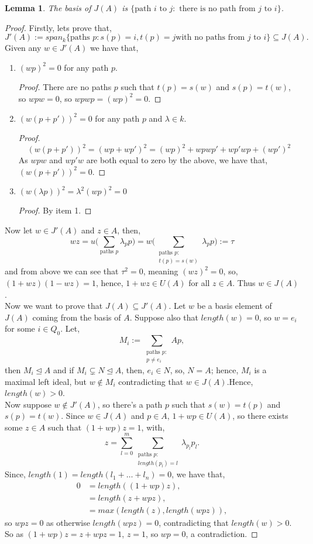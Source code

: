 \documentclass[11.5pt, twoside, a4paper, titlepage]{report}
\providecommand{\equ}[0]{\begin{equation*}}
\providecommand{\eequ}[0] {\end{equation*}}
\theoremstyle{definition}
\theoremstyle{plain}
\newtheorem{lem}[mydef]{Lemma}
\begin{document}
\begin{lem}
The basis of $J(A)$ is $\{\text{path } i \text{ to }j: \text{ there is no path from } j \text{ to }i\}$.
\end{lem}
\begin{proof}
Firstly, lets prove that, 
\equ
J'(A):= span_k\{\text{paths }p:s(p)=i, t(p)=j\text{with no paths from $j$ to $i$}\}\subseteq J(A).
\eequ
Given any $w\in J'(A)$ we have that, 
\begin{enumerate}
\item $(wp)^2=0$ for any path $p$.
\begin{proof}
There are no paths $p$ such that $t(p)=s(w)$ and $s(p)=t(w)$, so $wpw=0$, so $wpwp=(wp)^2=0$.
\end{proof}
\item $(w(p+p'))^2=0$ for any path $p$ and $\lambda\in k$.
\begin{proof}
\equ
(w(p+p'))^2=(wp+wp')^2=(wp)^2+wpwp'+wp'wp +(wp')^2
\eequ
As $wpw$ and $wp'w$ are both equal to zero by the above, we have that, $(w(p+p'))^2=0$.
\end{proof}
\item $(w(\lambda p))^2=\lambda^2(wp)^2=0$
\begin{proof}
By item 1.
\end{proof}
\end{enumerate}
Now let $w\in J'(A)$ and $z\in A$, then,
\equ
wz=u\big(\sum_{\text{paths }p}\lambda_pp\big)=w\big(\sum_{\substack{\text{paths }p:\\t(p)=s(w)}}\lambda_pp\big):=\tau
\eequ
and from above we can see that $\tau^2=0$, meaning $(wz)^2=0$, so, $(1+wz)(1-wz)=1$, hence, $1+wz\in U(A)$ for all $z\in A$. Thus $w\in J(A)$.\\
Now we want to prove that $J(A)\subseteq J'(A)$. Let $w$ be a basis element of $J(A)$ coming from the basis of $A$. Suppose also that $length(w)=0$, so $w=e_i$ for some $i\in Q_0$. Let, 
\equ
M_i:=\sum_{\substack{\text{paths }p:\\ p\neq e_i}}Ap,
\eequ
then $M_i\unlhd A$ and if $M_i\subsetneq N \unlhd A$, then, $e_i\in N$, so, $N=A$; hence, $M_i$ is a maximal left ideal, but $w\not \in M_i$ contradicting that $w \in J(A)$.Hence, $length(w)>0$.\\
Now suppose $w\not \in J'(A)$, so there's a path $p$ such that $s(w)=t(p)$ and $s(p)=t(w)$. Since $w \in J(A)$ and $p\in A$,  $1+wp \in U(A)$, so there exists some $z\in A$ such that $(1+wp)z=1$, with, 
\equ
z=\sum^m_{l=0}\sum_{\substack{\text{paths }p: \\ length(p_l)=l}}\lambda_{p_l}p_l.
\eequ
Since, $length(1)=length(l_1+\dots+l_n)=0$, we have that, 
\begin{align*}
0&=length((1+wp)z),\\
&=length(z+wpz),\\
&=max(length(z), length(wpz)),
\end{align*}
so $wpz=0$ as otherwise $length(wpz)=0$, contradicting that $length(w)>0$. So as $(1+wp)z=z+wpz=1$, $z=1$, so $wp=0$, a contradiction.
\end{proof}
\end{document}
